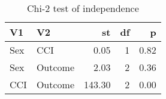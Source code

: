 \begin{table}

\caption{Chi-2 test of independence}
\centering
\begin{tabular}[t]{l|l|r|r|r}
\hline
V1 & V2 & st & df & p\\
\hline
Sex & CCI & 0.05 & 1 & 0.82\\
\hline
Sex & Outcome & 2.03 & 2 & 0.36\\
\hline
CCI & Outcome & 143.30 & 2 & 0.00\\
\hline
\end{tabular}
\end{table}
